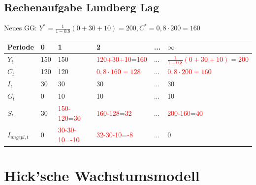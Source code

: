 \documentclass{scrartcl}
\begin{document}
\subsection{Rechenaufgabe Lundberg Lag}
Neues GG: $Y^* = \frac{1}{1-0.8}(0+30+10) = 200, C^* = 0,8\cdot200=160$
\begin{center}
\begin{tabular}{|l|l|l|l|l|l|}
\hline
Periode        & 0   & 1                              & 2   & ... & $\infty$ \\ \hline
$Y_{t}$        & 150 & 150                            & \textcolor{red}{120+30+10=160} & ... & \textcolor{red}{$\frac{1}{1-0.8}(0+30+10) = 200$}\\ \hline
$C_t$          & 120 & 120                            & \textcolor{red}{$0,8\cdot160=128$}   & ... & \textcolor{red}{$0,8\cdot200=160$}      \\ \hline
$I_{t}$        & 30  & 30                             & 30                             & ... & 30       \\ \hline
$G_t$          & 0   & 10                             & 10                             & ... & 10       \\ \hline
$S_t$          & 30  & \textcolor{red}{150-120=30}    & \textcolor{red}{160-128=32}    & ... & \textcolor{red}{200-160=40}       \\ \hline
$I_{ungepl,t}$ & 0   & \textcolor{red}{30-30-10=-10}  & \textcolor{red}{32-30-10=-8}   & ... & 0        \\ \hline
\end{tabular}
\end{center}

\section{Hick'sche Wachstumsmodell}
\end{document}
